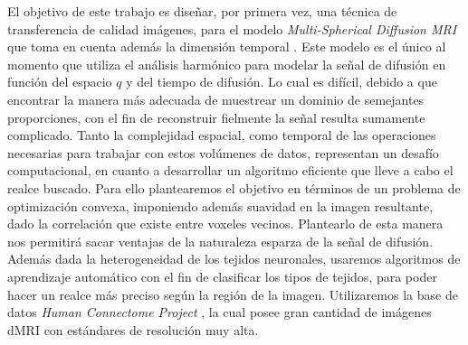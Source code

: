 \documentclass[a4paper,10pt]{article}
\begin{document}
El objetivo de este trabajo es diseñar, por primera vez, una técnica de transferencia de calidad 
imágenes, para el modelo \textit{Multi-Spherical Diffusion MRI} que toma en cuenta además la dimensión temporal 
\citep{Fick}. Este modelo es el \'unico al momento que utiliza el análisis harmónico para modelar la señal de difusión 
en función del espacio $q$ y del tiempo de difusión. Lo cual es difícil, debido a que encontrar la manera más adecuada 
de muestrear un dominio de semejantes proporciones, con el fin de reconstruir fielmente la señal resulta 
sumamente complicado.
%
Tanto la complejidad espacial, como temporal de 
las operaciones necesarias para trabajar con estos vol\'umenes de datos, representan un desafío computacional, en cuanto 
a desarrollar un algoritmo eficiente que lleve a cabo el realce buscado. Para ello plantearemos el objetivo en términos 
de un problema de optimización convexa, imponiendo además suavidad en la imagen resultante, dado la correlaci\'on que 
existe entre voxeles vecinos. Plantearlo de esta manera nos permitirá sacar ventajas de la naturaleza esparza de la 
señal de difusión. Además dada la heterogeneidad de los tejidos neuronales, usaremos algoritmos de aprendizaje 
automático con el fin de clasificar los tipos de tejidos, para poder hacer un realce más preciso según la región de la 
imagen. Utilizaremos la base de datos \textit{Human Connectome Project} \citep{Sotiropoulos2013125}, la cual posee gran 
cantidad de imágenes dMRI con estándares de 
resolución muy alta.

\clearpage


\end{document}
